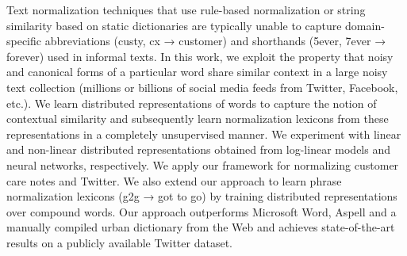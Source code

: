 Text normalization techniques that use rule-based normalization or string similarity based on static dictionaries are typically unable to capture domain-specific abbreviations (custy, cx → customer) and shorthands (5ever, 7ever → forever) used in informal texts. In this work, we exploit the property that noisy and canonical forms of a particular word share similar context in a large noisy text collection (millions or billions of social media feeds from Twitter, Facebook, etc.). We learn distributed representations of words to capture the notion of contextual similarity and subsequently learn normalization lexicons from these representations in a completely unsupervised manner. We experiment with linear and non-linear distributed representations obtained from log-linear models and neural networks, respectively. We apply our framework for normalizing customer care notes and Twitter. We also extend our approach to learn phrase normalization lexicons (g2g → got to go) by training distributed representations over compound words. Our approach outperforms Microsoft Word, Aspell and a manually compiled urban dictionary from the Web and achieves state-of-the-art results on a publicly available Twitter dataset.
